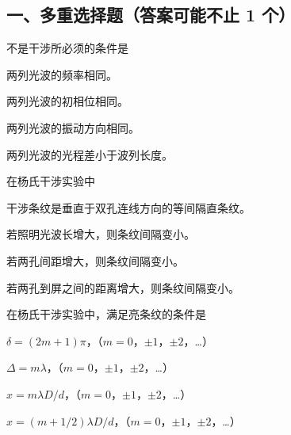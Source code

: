 \documentclass[standard, analysis, notocnum]{ExBook}
\newcommand{\answerarea}[1][8cm]{%
  \par\vspace{2mm}%
  \noindent{\color{themeColor!35}\rule{\linewidth}{0.4pt}}\par
  \noindent\begin{minipage}[t][#1][t]{\linewidth}\vspace{0pt}\end{minipage}\par
  \noindent{\color{themeColor!35}\rule{\linewidth}{0.4pt}}\par
}
\begin{document}
\subsection{一、多重选择题（答案可能不止 1 个）}
\begin{qitems}
\begin{bbox}
\qitem 不是干涉所必须的条件是
\par\noindent\hspace{2em}两列光波的频率相同。
\par\noindent\hspace{2em}两列光波的初相位相同。
\par\noindent\hspace{2em}两列光波的振动方向相同。
\par\noindent\hspace{2em}两列光波的光程差小于波列长度。
\answerarea[3.5cm]
\end{bbox}
\begin{bbox}
\qitem 在杨氏干涉实验中
\par\noindent\hspace{2em}干涉条纹是垂直于双孔连线方向的等间隔直条纹。
\par\noindent\hspace{2em}若照明光波长增大，则条纹间隔变小。
\par\noindent\hspace{2em}若两孔间距增大，则条纹间隔变小。
\par\noindent\hspace{2em}若两孔到屏之间的距离增大，则条纹间隔变小。
\answerarea[3.5cm]
\end{bbox}
\begin{bbox}
\qitem 在杨氏干涉实验中，满足亮条纹的条件是
\par\noindent\hspace{2em}$\delta =(2m+1)\pi$，（$m=0$，$\pm 1$，$\pm 2$，…）
\par\noindent\hspace{2em}$\Delta =m\lambda$，（$m=0$，$\pm 1$，$\pm 2$，…）
\par\noindent\hspace{2em}$x=m\lambda D/d$，（$m=0$，$\pm 1$，$\pm 2$，…）
\par\noindent\hspace{2em}$x=(m+1/2)\lambda D/d$，（$m=0$，$\pm 1$，$\pm 2$，…）
\answerarea[3.5cm]
\end{bbox}
\begin{bbox}

\end{bbox}
\end{qitems}
\end{document}
